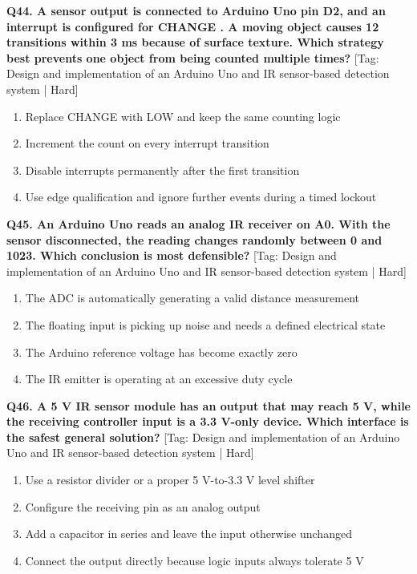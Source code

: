\noindent\textbf{Q44. A sensor output is connected to Arduino Uno pin D2, and an interrupt is configured for CHANGE . A moving object causes 12 transitions within 3 ms because of surface texture. Which strategy best prevents one object from being counted multiple times?} \hfill [Tag: Design and implementation of an Arduino Uno and IR sensor-based detection system | Hard]
\begin{enumerate}[label=(\alph*),topsep=2pt,itemsep=1pt,partopsep=0pt,parsep=0pt]
    \item {Replace CHANGE with LOW and keep the same counting logic}
    \item {Increment the count on every interrupt transition}
    \item {Disable interrupts permanently after the first transition}
    \item {Use edge qualification and ignore further events during a timed lockout}
\end{enumerate}
\vspace{2mm}

\noindent\textbf{Q45. An Arduino Uno reads an analog IR receiver on A0. With the sensor disconnected, the reading changes randomly between 0 and 1023. Which conclusion is most defensible?} \hfill [Tag: Design and implementation of an Arduino Uno and IR sensor-based detection system | Hard]
\begin{enumerate}[label=(\alph*),topsep=2pt,itemsep=1pt,partopsep=0pt,parsep=0pt]
    \item {The ADC is automatically generating a valid distance measurement}
    \item {The floating input is picking up noise and needs a defined electrical state}
    \item {The Arduino reference voltage has become exactly zero}
    \item {The IR emitter is operating at an excessive duty cycle}
\end{enumerate}
\vspace{2mm}

\noindent\textbf{Q46. A 5 V IR sensor module has an output that may reach 5 V, while the receiving controller input is a 3.3 V-only device. Which interface is the safest general solution?} \hfill [Tag: Design and implementation of an Arduino Uno and IR sensor-based detection system | Hard]
\begin{enumerate}[label=(\alph*),topsep=2pt,itemsep=1pt,partopsep=0pt,parsep=0pt]
    \item {Use a resistor divider or a proper 5 V-to-3.3 V level shifter}
    \item {Configure the receiving pin as an analog output}
    \item {Add a capacitor in series and leave the input otherwise unchanged}
    \item {Connect the output directly because logic inputs always tolerate 5 V}
\end{enumerate}
\vspace{2mm}

